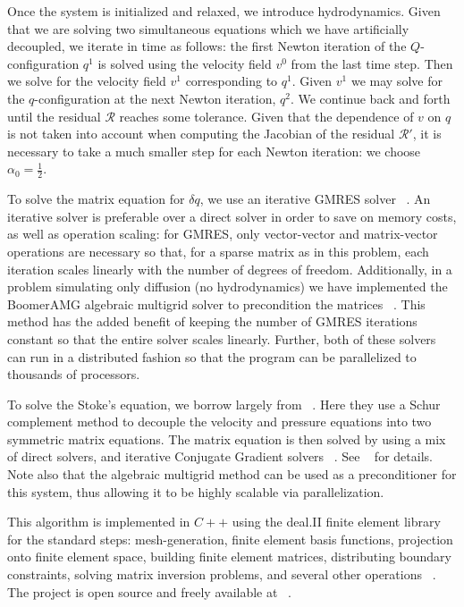 \documentclass[reqno]{article}
\begin{document}
  Once the system is initialized and relaxed, we introduce hydrodynamics.
  Given that we are solving two simultaneous equations which we have
  artificially decoupled, we iterate in time as follows: the first Newton
  iteration of the $Q$-configuration $q^1$ is solved using the velocity field
  $v^0$ from the last time step.
  Then we solve for the velocity field $v^1$ corresponding to $q^1$.
  Given $v^1$ we may solve for the $q$-configuration at the next Newton
  iteration, $q^2$.
  We continue back and forth until the residual $\mathcal{R}$ reaches some
  tolerance.
  Given that the dependence of $v$ on $q$ is not taken into account when
  computing the Jacobian of the residual $\mathcal{R}'$, it is necessary to take
  a much smaller step for each Newton iteration: we choose $\alpha_0 =
  \tfrac12$.

  To solve the matrix equation for $\delta q$, we use an iterative GMRES solver ~\cite{doi:10.1137/1.9781611971446.ch6}.
  An iterative solver is preferable over a direct solver in order to save on
  memory costs, as well as operation scaling: for GMRES, only vector-vector and
  matrix-vector operations are necessary so that, for a sparse matrix as in this
  problem, each iteration scales linearly with the number of degrees of freedom.
  Additionally, in a problem simulating only diffusion (no hydrodynamics) we
  have implemented the BoomerAMG algebraic multigrid solver to precondition the
  matrices ~\cite{henson_boomeramg_2002}.
  This method has the added benefit of keeping the number of GMRES iterations
  constant so that the entire solver scales linearly.
  Further, both of these solvers can run in a distributed fashion so that the
  program can be parallelized to thousands of processors.

  To solve the Stoke's equation, we borrow largely from ~\cite{step_22}.
  Here they use a Schur complement method to decouple the velocity and pressure
  equations into two symmetric matrix equations.
  The matrix equation is then solved by using a mix of direct solvers, and
  iterative Conjugate Gradient solvers ~\cite{doi:10.1137/1.9781611971446.ch6}.
  See ~\cite{step_22} for details.
  Note also that the algebraic multigrid method can be used as a preconditioner
  for this system, thus allowing it to be highly scalable via parallelization.

  This algorithm is implemented in $C++$ using the deal.II finite element
  library for the standard steps: mesh-generation, finite element basis
  functions, projection onto finite element space, building finite element
  matrices, distributing boundary constraints, solving matrix inversion
  problems, and several other operations ~\cite{dealII93, dealii2019design}.
  The project is open source and freely available at
  ~\cite{Myers_maier-saupe-lc-hydrodynamics_2022}.
\end{document}
